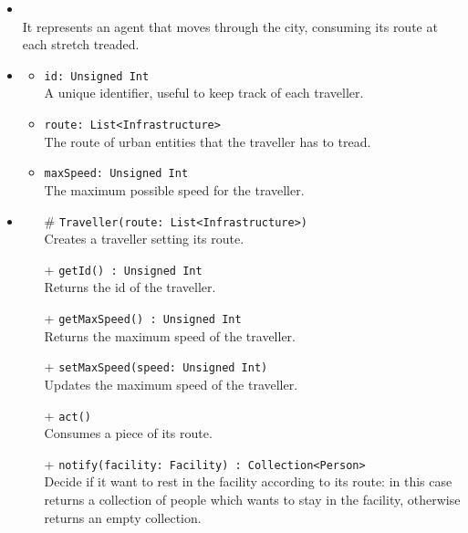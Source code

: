 \begin{itemize}
  \item \textbf{\descr} \\
    It represents an agent that moves through the city, consuming its 
route at each stretch treaded.
  \item \textbf{\attrs}
  \begin{itemize}
    \item \texttt{id: Unsigned Int} \\
A unique identifier, useful to keep track of each traveller.
    \item \texttt{route: List<Infrastructure>} \\
The route of urban entities that the traveller has to tread.
    \item \texttt{maxSpeed: Unsigned Int} \\
The maximum possible speed for the traveller.
  \end{itemize}
  \item \textbf{\ops}
  \begin{itemize}
  \item[\#]  \texttt{Traveller(route: List<Infrastructure>)} \\
Creates a traveller setting its route.
    \item[+] \texttt{getId() : Unsigned Int} \\
Returns the id of the traveller.
   \item[+] \texttt{getMaxSpeed() : Unsigned Int} \\
Returns the maximum speed of the traveller.
    \item[+] \texttt{setMaxSpeed(speed: Unsigned Int)} \\
Updates the maximum speed of the traveller.
    \item[+]  \texttt{act()} \\
Consumes a piece of its route.
    \item[+] \texttt{notify(facility: Facility) : Collection<Person>} \\
Decide if it want to rest in the facility according to its route: in this case
returns a collection of people which wants to stay in the facility, otherwise returns
an empty collection.
  \end{itemize}
\end{itemize}
